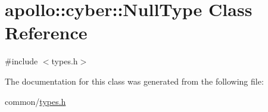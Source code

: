 \hypertarget{classapollo_1_1cyber_1_1NullType}{\section{apollo\-:\-:cyber\-:\-:Null\-Type Class Reference}
\label{classapollo_1_1cyber_1_1NullType}
}


{\ttfamily \#include $<$types.\-h$>$}



The documentation for this class was generated from the following file\-:\begin{DoxyCompactItemize}
\item 
common/\hyperlink{types_8h}{types.\-h}\end{DoxyCompactItemize}
